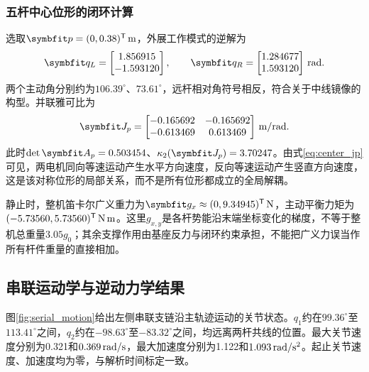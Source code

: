 \subsubsection{五杆中心位形的闭环计算}

选取$\vect p=(0,0.38)^\T\units m$，外展工作模式的逆解为
\begin{equation}
\vect q_L=\begin{bmatrix}1.856915\\-1.593120\end{bmatrix},\qquad
\vect q_R=\begin{bmatrix}1.284677\\1.593120\end{bmatrix}\units{rad}.
\end{equation}
两个主动角分别约为$106.39^\circ$、$73.61^\circ$，远杆相对角符号相反，符合关于中线镜像的构型。并联雅可比为
\begin{equation}
\vect J_p=\begin{bmatrix}-0.165692&-0.165692\\-0.613469&0.613469\end{bmatrix}\units{m/rad}.
\label{eq:center_jp}
\end{equation}
此时$\det\vect A_p=0.503454$、$\kappa_2(\vect J_p)=3.70247$。由式\eqref{eq:center_jp}可见，两电机同向等速运动产生水平方向速度，反向等速运动产生竖直方向速度，这是该对称位形的局部关系，而不是所有位形都成立的全局解耦。

静止时，整机笛卡尔广义重力为$\vect g_x\approx(0,9.34945)^\T\units N$，主动平衡力矩为$(-5.73560,5.73560)^\mathsf T\,\mathrm{N\,m}$。这里$g_{x,y}$是各杆势能沿末端坐标变化的梯度，不等于整机总重量$3.05g_0$；其余支撑作用由基座反力与闭环约束承担，不能把广义力误当作所有杆件重量的直接相加。

\subsection{串联运动学与逆动力学结果}

图\ref{fig:serial_motion}给出左侧串联支链沿主轨迹运动的关节状态。$q_1$约在$99.36^\circ$至$113.41^\circ$之间，$q_2$约在$-98.63^\circ$至$-83.32^\circ$之间，均远离两杆共线的位置。最大关节速度分别为0.321和$0.369\,\mathrm{rad/s}$，最大加速度分别为1.122和$1.093\,\mathrm{rad/s^2}$。起止关节速度、加速度均为零，与解析时间标定一致。


